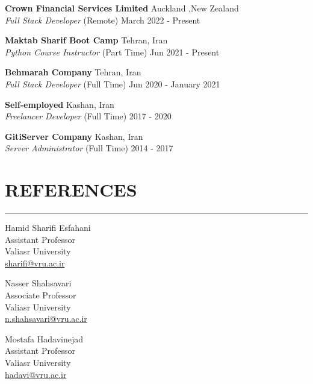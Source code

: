 \documentclass[12pt]{res} %
\begin{document}
\begin{resume}
\vspace{1pt}

{\bf Crown Financial Services Limited} \hfill Auckland ,New Zealand \\
\textit{Full Stack Developer} \hfill (Remote)  March 2022 - Present

{\bf Maktab Sharif Boot Camp} \hfill Tehran, Iran \\
\textit{Python Course Instructor} \hfill (Part Time) Jun 2021 - Present

{\bf Behmarah Company} \hfill Tehran, Iran \\
\textit{Full Stack Developer} \hfill (Full Time) Jun 2020 - January 2021

{\bf Self-employed} \hfill Kashan, Iran \\
\textit{ Freelancer Developer  } \hfill (Full Time) 2017 - 2020

{\bf GitiServer Company} \hfill Kashan, Iran \\
\textit{ Server Administrator } \hfill (Full Time) 2014 - 2017


\section{\bf REFERENCES}
\vspace{-8pt}
\noindent\rule{\textwidth}{0.5mm}
\begin{multicols}{3}
Hamid Sharifi Esfahani\\
Assistant Professor\\ Valiasr University\\{\href{mailto:sharifi@vru.ac.ir}{{sharifi@vru.ac.ir}}}

\columnbreak
Nasser Shahsavari\\Associate Professor\\ Valiasr University  \\{\href{mailto:n.shahsavari@vru.ac.ir}{{n.shahsavari@vru.ac.ir}}}

\columnbreak
Mostafa Hadavinejad\\Assistant Professor\\ Valiasr University \\{\href{mailto:hadavi@vru.ac.ir}{{hadavi@vru.ac.ir}}}

\end{multicols}

\end{resume}
\end{document}
